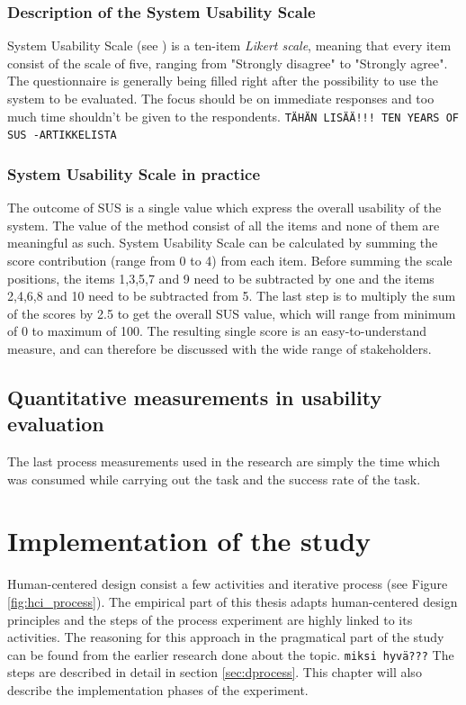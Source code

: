 \documentclass[12pt,a4paper,oneside,pdftex]{report}
\begin{document}
\subsection{Description of the System Usability Scale}
System Usability Scale (see ) is a ten-item \emph{Likert scale}, meaning that every item consist of the scale of five, ranging from "Strongly disagree" to "Strongly agree". The questionnaire is generally being filled right after the possibility to use 		the system to be evaluated. The focus should be on immediate responses and too much time shouldn't be given to the respondents. \cite{RefWorks:10} 
\texttt{TÄHÄN LISÄÄ!!! TEN YEARS OF SUS -ARTIKKELISTA}


\subsection{System Usability Scale in practice}
The outcome of SUS is a single value which express the overall usability of the system. The value of the method consist of all the items and none of them are meaningful as such. System Usability Scale can be calculated by summing the score contribution (range from 0 to 4) 		from each item. Before summing the scale positions, the items 1,3,5,7 and 9 need to be subtracted by one and the items 2,4,6,8 and 10 need to be subtracted from 5. The last step is to multiply the sum of the scores by 2.5 to get the overall SUS value, which will range from minimum of 0 to maximum of 100. \cite{RefWorks:10} The resulting single score is an easy-to-understand measure, and can therefore be discussed with the wide range of stakeholders. \cite{RefWorks:12} 

	

\section{Quantitative measurements in usability evaluation}
\label{sec:other}
The last process measurements used in the research are simply the time which was consumed while carrying out the task and the success rate of the task.


 
    
\chapter{Implementation of the study}
\label{chapter:implementation}

Human-centered design consist a few activities and iterative process (see Figure \ref{fig:hci_process}). \cite{RefWorks:16} The empirical part of this thesis adapts human-centered design principles and the steps of the process experiment are highly linked to its activities. The reasoning for this approach in the pragmatical part of the study can be found from the earlier research done about the topic. \texttt{miksi hyvä???} 
The steps are described in detail in section \ref{sec:dprocess}. This chapter will also describe the implementation phases of the experiment. 
\end{document}
